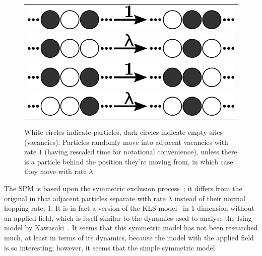 \begin{figure}
\vspace{1em}
\caption{\label{fig:rates} White circles indicate particles, dark circles indicate empty sites (vacancies). Particles randomly move into adjacent vacancies with rate $1$ (having rescaled time for notational convenience), unless there is a
particle behind the position they're moving from, in which case they move with rate $\lambda$.}
 \begin{tabular}{c}
    \includegraphics[width=\linewidth]{../tex-src/images/rateDiags/freeLeft} \\
    \includegraphics[width=\linewidth]{../tex-src/images/rateDiags/stickLeft} \\
    \includegraphics[width=\linewidth]{../tex-src/images/rateDiags/freeRight} \\
    \includegraphics[width=\linewidth]{../tex-src/images/rateDiags/stickRight} \\
    \end{tabular}
    \vspace{-1em}
\end{figure}
The SPM is based upon the symmetric exclusion process~\cite{sugden2007dynamically, Kollmann2003,  Lin2005, Hegde2014, Krapivsky2014, Imamura2017};
it differs from the original in that adjacent particles separate with rate $\lambda$
instead of their normal hopping rate, $1$. It is in fact a version of the KLS model~\cite{Katz1984, Zia2010} in 1-dimension without an applied field, which is itself similar to the dynamics used to analyse the Ising model by
Kawasaki~\cite{PhysRev.145.224}. It seems that this symmetric model has not been researched much, at least in terms of its dynamics, because the model with the applied field is so interesting; however, it seems that the simple symmetric model
